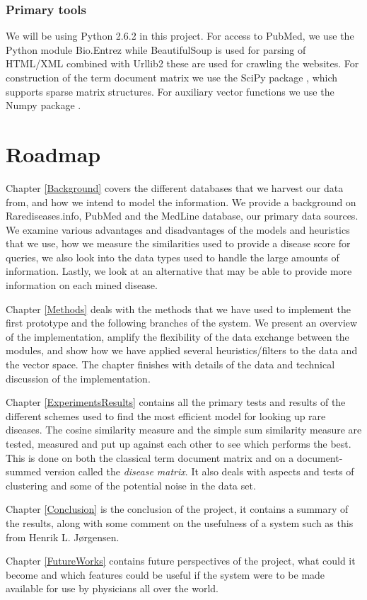 \subsubsection{Primary tools}
We will be using Python 2.6.2 \cite{PythonLanguage} in this project. For access to PubMed, we use
the Python module Bio.Entrez \cite{EntrezProgUtil} while BeautifulSoup
\cite{BS} is used for parsing of HTML/XML combined with Urllib2
\cite{UL2} these are used for crawling the websites. For construction
of the term document matrix we use the SciPy package \cite{SciPy},
which supports sparse matrix structures. For auxiliary vector
functions we use the Numpy package \cite{NumPy}.

\section{Roadmap}

Chapter \ref{Background} covers the different databases that we
harvest our data from, and how we intend to model the
information. We provide a background on Rarediseases.info, PubMed and
the MedLine database, our primary data sources. We examine various
advantages and disadvantages of the models and heuristics that we use,
how we measure the similarities used to provide a disease score for
queries, we also look into the data types used to handle the large
amounts of information. Lastly, we look at an alternative that may
be able to provide more information on each mined disease.

Chapter \ref{Methods} deals with the methods that we have used to
implement the first prototype and the following branches of the
system. We present an overview of the implementation, amplify the
flexibility of the data exchange between the modules, and show how we
have applied several heuristics/filters to the data and the vector
space. The chapter finishes with details of the data and technical
discussion of the implementation.

Chapter \ref{ExperimentsResults} contains all the primary tests and
results of the different schemes used to find the most efficient model
for looking up rare diseases. The cosine similarity measure and the
simple sum similarity measure are tested, measured and put up against
each other to see which performs the best. This is done on both the
classical term document matrix and on a document-summed version called
the \textit{disease matrix}. It also deals with aspects and tests of
clustering and some of the potential noise in the data set.

Chapter \ref{Conclusion} is the conclusion of the project, it contains
a summary of the results, along with some comment on the usefulness of
a system such as this from Henrik L. J\o rgensen.


Chapter \ref{FutureWorks} contains future perspectives of the project,
what could it become and which features could be useful if the system
were to be made available for use by physicians all over the world.

